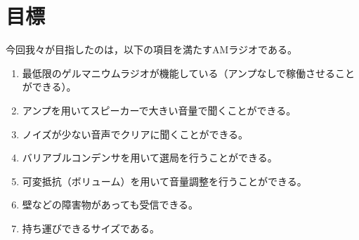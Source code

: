 \documentclass[report.tex]{subfiles}
\begin{document}
\section{目標}

今回我々が目指したのは，以下の項目を満たすAMラジオである。

\begin{enumerate}
  \item 最低限のゲルマニウムラジオが機能している（アンプなしで稼働させることができる）。
  \item アンプを用いてスピーカーで大きい音量で聞くことができる。
  \item ノイズが少ない音声でクリアに聞くことができる。
  \item バリアブルコンデンサを用いて選局を行うことができる。
  \item 可変抵抗（ボリューム）を用いて音量調整を行うことができる。
  \item 壁などの障害物があっても受信できる。
  \item 持ち運びできるサイズである。
\end{enumerate}
\end{document}
